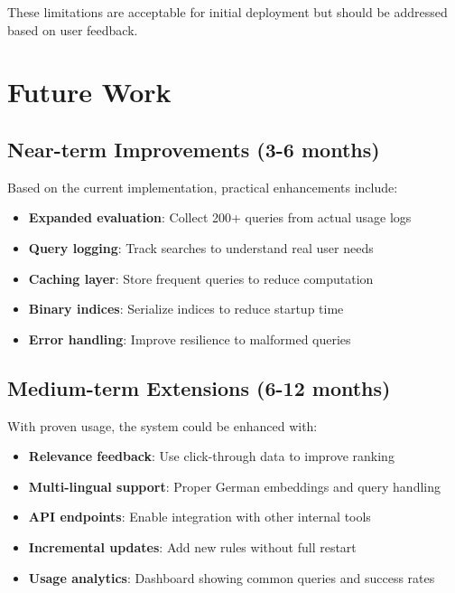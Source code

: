 These limitations are acceptable for initial deployment but should be addressed based on user feedback.

\section{Future Work}

\subsection{Near-term Improvements (3-6 months)}

Based on the current implementation, practical enhancements include:

\begin{itemize}[leftmargin=*,itemsep=2pt,topsep=2pt]
  \item \textbf{Expanded evaluation}: Collect 200+ queries from actual usage logs
  \item \textbf{Query logging}: Track searches to understand real user needs
  \item \textbf{Caching layer}: Store frequent queries to reduce computation
  \item \textbf{Binary indices}: Serialize indices to reduce startup time
  \item \textbf{Error handling}: Improve resilience to malformed queries
\end{itemize}

\subsection{Medium-term Extensions (6-12 months)}

With proven usage, the system could be enhanced with:

\begin{itemize}[leftmargin=*,itemsep=2pt,topsep=2pt]
  \item \textbf{Relevance feedback}: Use click-through data to improve ranking
  \item \textbf{Multi-lingual support}: Proper German embeddings and query handling
  \item \textbf{API endpoints}: Enable integration with other internal tools
  \item \textbf{Incremental updates}: Add new rules without full restart
  \item \textbf{Usage analytics}: Dashboard showing common queries and success rates
\end{itemize}

